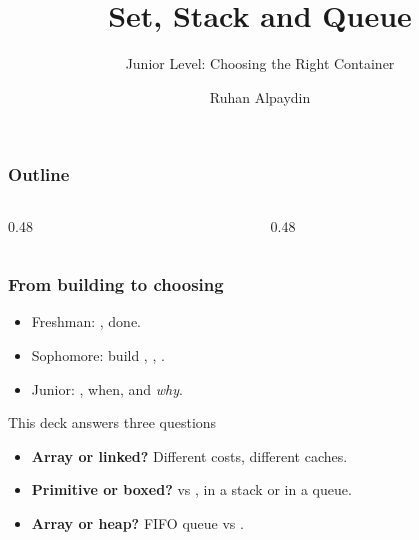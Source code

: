 \documentclass[aspectratio=169,10pt,compress]{beamer}
\title{Set, Stack and Queue}
\subtitle{Junior Level: Choosing the Right Container}
\author[Bingol]{Ruhan Alpaydin}
\institute[FCIS]{
    Faculty of Computer and Information Sciences\\
    Yeditepe University
}
\date{
	{\tiny \hbTimeStamp}
}
\begin{document}
\begin{frame}[t,fragile]
  \titlepage
\end{frame}




\begin{frame}[t,fragile] \frametitle{Outline}
  \begin{columns}[T]
    \begin{column}{0.48\textwidth}
      \tableofcontents[sections={1-4}, hideallsubsections]
    \end{column}
    \begin{column}{0.48\textwidth}
      \tableofcontents[sections={5-8}, hideallsubsections]
    \end{column}
  \end{columns}
\end{frame}





\begin{frame}[t,fragile] \frametitle{From building to choosing}
  \begin{itemize}
    \item Freshman: , done.
    \item Sophomore: build , , .
    \item Junior: , when, and \emph{why}.
  \end{itemize}
  \begin{block}{This deck answers three questions}
    \small
    \begin{itemize}
      \item \textbf{Array or linked?} Different costs, different caches.
      \item \textbf{Primitive or boxed?}  vs , in a stack or in a queue.
      \item \textbf{Array or heap?} FIFO queue vs .
    \end{itemize}
  \end{block}
\end{frame}
\end{document}
